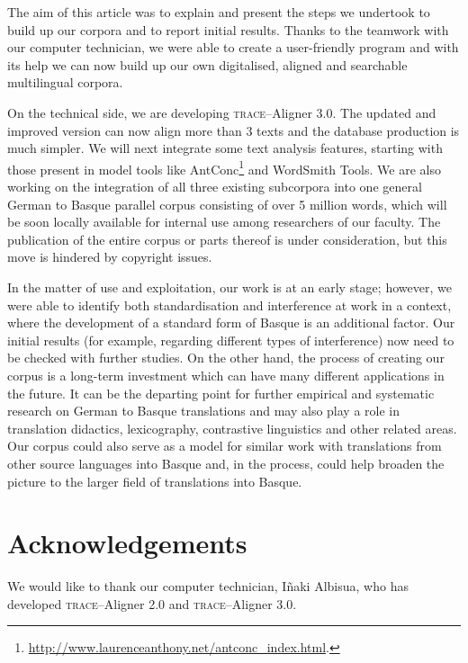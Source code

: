 \documentclass[output=paper]{LSP/langsci}
\begin{document}
The aim of this article was to explain and present the steps we undertook to build up our corpora and to report initial results. Thanks to the teamwork with our computer technician, we were able to create a user-friendly program and with its help we can now build up our own digitalised, aligned and searchable multilingual corpora.

On the technical side, we are developing \textsc{trace}--Aligner 3.0. The updated and improved version can now align more than 3 texts and the database production is much simpler. We will next integrate some text analysis features, starting with those present in model tools like AntConc\footnote{\url{http://www.laurenceanthony.net/antconc_index.html}.} and WordSmith Tools. We are also working on the integration of all three existing subcorpora into one general German to Basque parallel corpus consisting of over 5 million words, which will be soon locally available for internal use among researchers of our faculty. The publication of the entire corpus or parts thereof is under consideration, but this move is hindered by copyright issues.

In the matter of use and exploitation, our work is at an early stage; however, we were able to identify both standardisation and interference at work in a context, where the development of a standard form of Basque is an additional factor. Our initial results (for example, regarding different types of interference) now need to be checked with further studies. On the other hand, the process of creating our corpus is a long-term investment which can have many different applications in the future. It can be the departing point for further empirical and systematic research on German to Basque translations and may also play a role in translation didactics, lexicography, contrastive linguistics and other related areas. Our corpus could also serve as a model for similar work with translations from other source languages into Basque and, in the process, could help broaden the picture to the larger field of translations into Basque.


\section*{Acknowledgements}

We would like to thank our computer technician, Iñaki Albisua, who has developed \textsc{trace}--Aligner 2.0 and \textsc{trace}--Aligner 3.0.

\printbibliography[heading=subbibliography,notkeyword=this]
\end{document}
